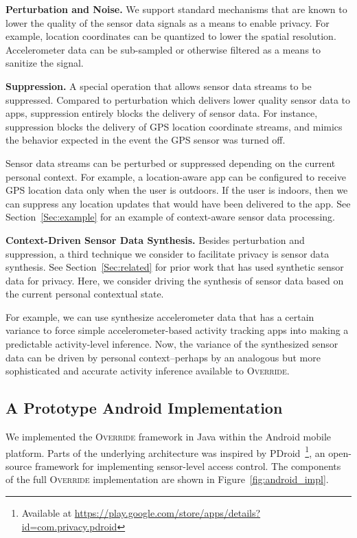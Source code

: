 \documentclass[10pt]{sensys-proc}
\begin{document}
\textbf{Perturbation and Noise.} We support standard mechanisms that are known to lower the quality of the sensor data signals as a means to enable privacy. For example, location coordinates can be quantized to lower the spatial resolution. Accelerometer data can be sub-sampled or otherwise filtered as a means to sanitize the signal.

\textbf{Suppression.} A special operation that allows sensor data streams to be suppressed. Compared  to perturbation which delivers lower quality sensor data to apps, suppression entirely blocks the delivery of sensor data. For instance, suppression blocks the delivery of GPS location coordinate streams, and mimics the behavior expected in the event the GPS sensor was turned off.

Sensor data streams can be perturbed or suppressed depending on the current personal context. For example, a location-aware app can be configured to receive GPS location data only when the user is outdoors. If the user is indoors, then we can suppress any location updates that would have been delivered to the app. See Section~\ref{Sec:example} for an example of context-aware sensor data processing.

\textbf{Context-Driven Sensor Data Synthesis.} Besides perturbation and suppression, a third technique we consider to facilitate privacy is sensor data synthesis. See Section~\ref{Sec:related} for prior work that has used synthetic sensor data for privacy. Here, we consider driving the synthesis of sensor data based on the current personal contextual state.

For example, we can use synthesize accelerometer data that has a certain variance to force simple  accelerometer-based activity tracking apps into making a predictable activity-level inference. Now, the variance of the synthesized sensor data can be driven by personal context--perhaps by an analogous but more sophisticated and accurate activity inference available to \textsc{Override}.

\subsection{A Prototype Android Implementation}
\label{sec:implementation}
We implemented the \textsc{Override} framework in Java within the Android mobile platform. Parts of the underlying architecture was inspired by PDroid~\footnote{Available at \url{https://play.google.com/store/apps/details?id=com.privacy.pdroid}}, an open-source framework for implementing sensor-level access control. The components of the full \textsc{Override} implementation are shown in Figure~\ref{fig:android_impl}.
\end{document}
